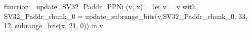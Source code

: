 function _update_SV32_Paddr_PPNi (v, x) = let v = { v with SV32_Paddr_chunk_0 = update_subrange_bits(v.SV32_Paddr_chunk_0, 33, 12, subrange_bits(x, 21, 0)) } in
  v
